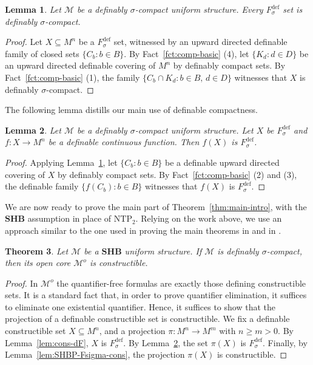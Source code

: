 \documentclass[12pt]{article}
\newcommand{\Mm}{\mathcal{M}}
\newcommand{\dF}{\ensuremath{F_\sigma^{\text{def}}}}
\newcommand{\BP}{\textbf{SHB}}
\newcommand{\NTP}{\ensuremath{\mathrm{NTP}_2}}
\newcommand{\Mo}{\Mm^o}%
\newtheorem{theorem}{Theorem}[section] %
\newtheorem{lemma}[theorem]{Lemma}
\theoremstyle{definition}
\theoremstyle{remark}
\begin{document}
\begin{lemma}\label{lem:compdF}
Let $\Mm$ be a definably $\sigma$-compact uniform structure. Every $\dF$ set is definably $\sigma$-compact.
\end{lemma}
\begin{proof}
Let $X\subseteq M^n$ be a $\dF$ set, witnessed by an upward directed definable family of closed sets $\{ C_b : b\in B\}$. By Fact~\ref{fct:comp-basic} (4),
let $\{ K_d: d\in D\}$ be an upward directed definable covering of $M^n$ by definably compact sets. By Fact~\ref{fct:comp-basic} (1), the family $\{ C_b \cap K_d : b\in B,\, d\in D\}$ witnesses that $X$ is definably $\sigma$-compact. 
\end{proof}

The following lemma distills our main use of definable compactness. 

\begin{lemma}\label{lem:image-dF}
Let $\Mm$ be a definably $\sigma$-compact uniform structure. Let $X$ be $\dF$ and $f:X\rightarrow M^n$ be a definable continuous function. Then $f(X)$ is $\dF$. 
\end{lemma}
\begin{proof}
Applying Lemma~\ref{lem:compdF}, let $\{ C_b: b\in B\}$ be a definable upward directed covering of $X$ by definably compact sets. By Fact~\ref{fct:comp-basic} (2) and (3), the definable family $\{ f(C_b) : b\in B\}$ witnesses that $f(X)$ is $\dF$. 
\end{proof}

We are now ready to prove the main part of Theorem~\ref{thm:main-intro}, with the $\BP$ assumption in place of $\NTP$. Relying on the work above, we use an approach similar to the one used in proving the main theorems in \cite{MS99} and in \cite{DMS10}. 

\begin{theorem}\label{thm:main-BP}
Let $\Mm$ be a $\BP$ uniform structure. If $\Mm$ is definably $\sigma$-compact, then its open core $\Mm^o$ is constructible. 
\end{theorem}
\begin{proof}
In $\Mo$ the quantifier-free formulas are exactly those defining constructible sets. It is a standard fact that, in order to prove quantifier elimination, it suffices to eliminate one existential quantifier. Hence, it suffices to show that the projection of a definable constructible set is constructible. We fix a definable constructible set $X \subseteq M^{n}$, and a projection $\pi:M^n\rightarrow M^m$ with $n\geq m>0$.  
By Lemma~\ref{lem:cons-dF}, $X$ is $\dF$. By Lemma~\ref{lem:image-dF}, the set $\pi(X)$ is $\dF$. Finally, by Lemma~\ref{lem:SHBP-Fsigma-cons}, the projection $\pi(X)$ is constructible. 
\end{proof}
\end{document}
